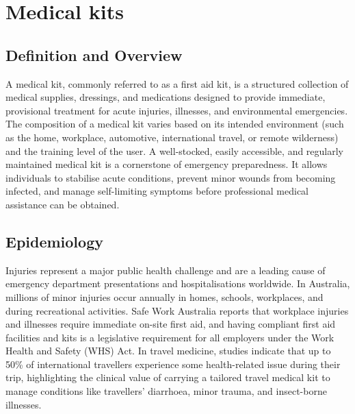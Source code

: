 \chapter{Medical kits}

\section*{Definition and Overview}
A medical kit, commonly referred to as a first aid kit, is a structured collection of medical supplies, dressings, and medications designed to provide immediate, provisional treatment for acute injuries, illnesses, and environmental emergencies. The composition of a medical kit varies based on its intended environment (such as the home, workplace, automotive, international travel, or remote wilderness) and the training level of the user. A well-stocked, easily accessible, and regularly maintained medical kit is a cornerstone of emergency preparedness. It allows individuals to stabilise acute conditions, prevent minor wounds from becoming infected, and manage self-limiting symptoms before professional medical assistance can be obtained.

\section*{Epidemiology}
Injuries represent a major public health challenge and are a leading cause of emergency department presentations and hospitalisations worldwide. In Australia, millions of minor injuries occur annually in homes, schools, workplaces, and during recreational activities. Safe Work Australia reports that workplace injuries and illnesses require immediate on-site first aid, and having compliant first aid facilities and kits is a legislative requirement for all employers under the Work Health and Safety (WHS) Act. In travel medicine, studies indicate that up to 50\% of international travellers experience some health-related issue during their trip, highlighting the clinical value of carrying a tailored travel medical kit to manage conditions like travellers' diarrhoea, minor trauma, and insect-borne illnesses.

